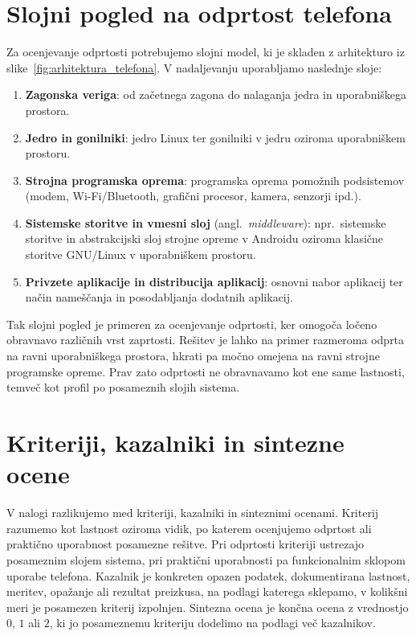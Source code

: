 \documentclass[a4paper,12pt,openright]{book}
\begin{document}
\section{Slojni pogled na odprtost telefona}
\label{sec:model_sloji}

Za ocenjevanje odprtosti potrebujemo slojni model, ki je skladen z arhitekturo iz slike~\ref{fig:arhitektura_telefona}.
V nadaljevanju uporabljamo naslednje sloje:

\begin{enumerate}
  \item \textbf{Zagonska veriga}: od začetnega zagona do nalaganja jedra in uporabniškega prostora.
  \item \textbf{Jedro in gonilniki}: jedro Linux ter gonilniki v jedru oziroma uporabniškem prostoru.
  \item \textbf{Strojna programska oprema}: programska oprema pomožnih podsistemov (modem, Wi-Fi/Bluetooth, grafični procesor, kamera, senzorji ipd.).
  \item \textbf{Sistemske storitve in vmesni sloj} (angl.~\textit{middleware}): npr.~sistemske storitve in abstrakcijski sloj strojne opreme v Androidu oziroma klasične storitve GNU/Linux v uporabniškem prostoru.
  \item \textbf{Privzete aplikacije in distribucija aplikacij}: osnovni nabor aplikacij ter način nameščanja in posodabljanja dodatnih aplikacij.
\end{enumerate}

Tak slojni pogled je primeren za ocenjevanje odprtosti, ker omogoča ločeno obravnavo različnih vrst zaprtosti.
Rešitev je lahko na primer razmeroma odprta na ravni uporabniškega prostora, hkrati pa močno omejena na ravni strojne programske opreme.
Prav zato odprtosti ne obravnavamo kot ene same lastnosti, temveč kot profil po posameznih slojih sistema.

\section{Kriteriji, kazalniki in sintezne ocene}
\label{sec:model_kriteriji_kazalniki_ocene}

V nalogi razlikujemo med kriteriji, kazalniki in sinteznimi ocenami.
Kriterij razumemo kot lastnost oziroma vidik, po katerem ocenjujemo odprtost ali praktično uporabnost posamezne rešitve.
Pri odprtosti kriteriji ustrezajo posameznim slojem sistema, pri praktični uporabnosti pa funkcionalnim sklopom uporabe telefona.
Kazalnik je konkreten opazen podatek, dokumentirana lastnost, meritev, opažanje ali rezultat preizkusa, na podlagi katerega sklepamo, v kolikšni meri je posamezen kriterij izpolnjen.
Sintezna ocena je končna ocena z vrednostjo $0$, $1$ ali $2$, ki jo posameznemu kriteriju dodelimo na podlagi več kazalnikov.
\end{document}

